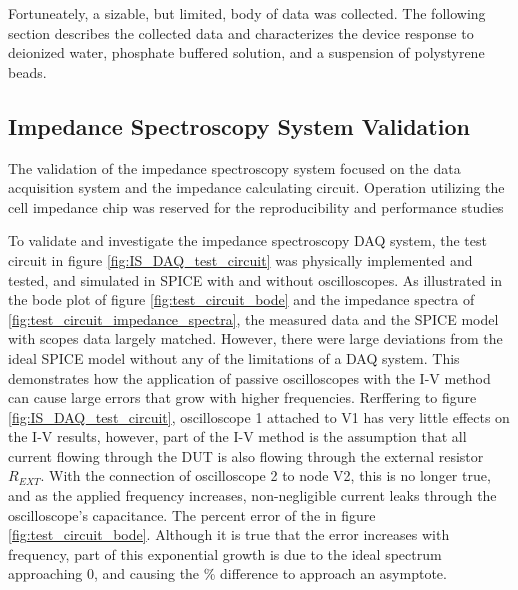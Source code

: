 \par Fortuneately, a sizable, but limited, body of data was collected. The following section describes the collected data and characterizes the device response to deionized water, phosphate buffered solution, and a suspension of polystyrene beads.

\FloatBarrier

\subsection{Impedance Spectroscopy System Validation}

\par The validation of the impedance spectroscopy system focused on the data acquisition system and the impedance calculating circuit. Operation utilizing the cell impedance chip was reserved for the reproducibility and performance studies



\par To validate and investigate the impedance spectroscopy DAQ system, the test circuit in figure \ref{fig:IS_DAQ_test_circuit} was physically implemented and tested, and simulated in SPICE with and without oscilloscopes. As illustrated in the bode plot of figure \ref{fig:test_circuit_bode} and the impedance spectra of \ref{fig:test_circuit_impedance_spectra}, the measured data and the SPICE model with scopes data largely matched. However, there were large deviations from the ideal SPICE model without any of the limitations of a DAQ system. This demonstrates how the application of passive oscilloscopes with the I-V method can cause large errors that grow with higher frequencies. Rerffering to figure \ref{fig:IS_DAQ_test_circuit}, oscilloscope 1 attached to V1 has very little effects on the I-V results, however, part of the I-V method is the assumption that all current flowing through the DUT is also flowing through the external resistor $R_{EXT}$. With the connection of oscilloscope 2 to node V2, this is no longer true, and as the applied frequency increases, non-negligible current leaks through the oscilloscope's capacitance. The percent error of the in figure \ref{fig:test_circuit_bode}. Although it is true that the error increases with frequency, part of this exponential growth is due to the ideal spectrum approaching 0, and causing the \% difference to approach an asymptote.  

